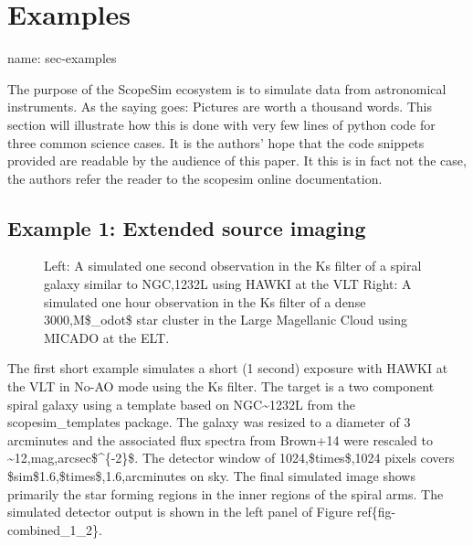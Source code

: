 

\section{Examples%
  \label{examples}%
}

\begin{DUfieldlist}
\item[{name:}]
sec-examples
\end{DUfieldlist}

The purpose of the ScopeSim ecosystem is to simulate data from astronomical instruments.
As the saying goes: Pictures are worth a thousand words.
This section will illustrate how this is done with very few lines of python code for three common science cases.
It is the authors' hope that the code snippets provided are readable by the audience of this paper.
It this is in fact not the case, the authors refer the reader to the scopesim online documentation.


\subsection{Example 1: Extended source imaging%
  \label{example-1-extended-source-imaging}%
}

\begin{figure}[H]
\noindent{}\label{fig-combined-1-2}

\caption{Left: A simulated one second observation in the Ks filter of a spiral galaxy similar to NGC,1232L using HAWKI at the VLT
Right: A simulated one hour observation in the Ks filter of a dense 3000,M\$\_odot\$ star cluster in the Large Magellanic Cloud using MICADO at the ELT.}
\end{figure}

The first short example simulates a short (1 second) exposure with HAWKI at the VLT in No-AO mode using the Ks filter.
The target is a two component spiral galaxy using a template based on NGC\textasciitilde{}1232L from the scopesim\_templates package.
The galaxy was resized to a diameter of 3 arcminutes and the associated flux spectra from Brown+14 were rescaled to \textasciitilde{}12,mag,arcsec\$\textasciicircum{}\{-2\}\$.
The detector window of 1024,\$times\$,1024 pixels covers \$sim\$1.6,\$times\$,1.6,arcminutes on sky.
The final simulated image shows primarily the star forming regions in the inner regions of the spiral arms.
The simulated detector output is shown in the left panel of Figure ref\{fig-combined\_1\_2\}.

